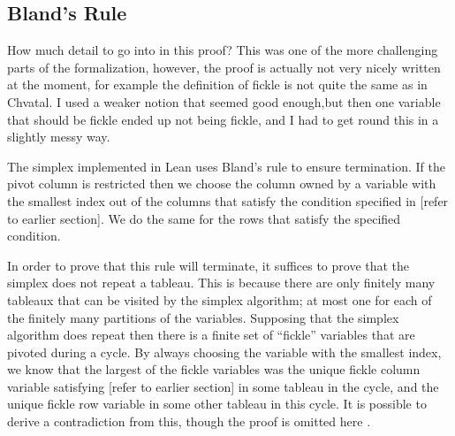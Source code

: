 \documentclass[11pt]{article} %
\begin{document}

\subsection{Bland's Rule}\label{section:bland}

\color{red}
How much detail to go into in this proof? This was one of the more challenging parts of the formalization, however, the proof is actually not very nicely written at the moment, for example the definition of fickle is not quite the same as in Chvatal. I used a weaker notion that seemed good enough,but then one variable that should be fickle ended up not being fickle, and I had to get round this in a slightly messy way.
\color{black}

The simplex implemented in Lean uses Bland's rule to ensure termination. If the pivot column is restricted then we choose the column owned by a variable with the smallest index out of the columns that satisfy the condition specified in [refer to earlier section]. We do the same for the rows that satisfy the specified condition.

In order to prove that this rule will terminate, it suffices to prove that the simplex does not repeat a tableau. This is because there are only finitely many tableaux that can be visited by the simplex algorithm; at most one for each of the finitely many partitions of the variables. Supposing that the simplex algorithm does repeat then there is a finite set of ``fickle'' variables that are pivoted during a cycle. By always choosing the variable with the smallest index, we know that the largest of the fickle variables was the unique fickle column variable satisfying [refer to earlier section] in some tableau in the cycle, and the unique fickle row variable in some other tableau in this cycle. It is possible to derive a contradiction from this, though the proof is omitted here \cite{Chvatal}.
\end{document}
